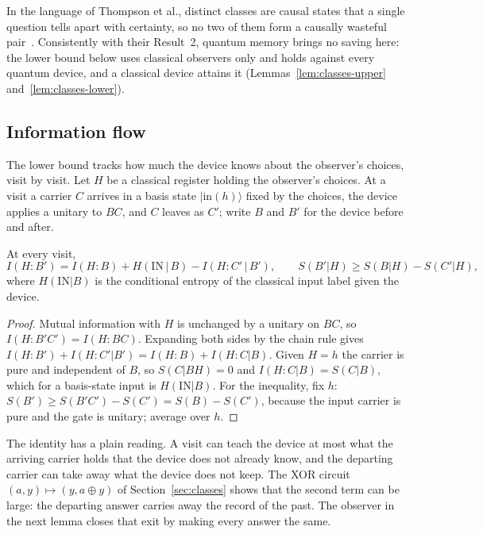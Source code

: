 In the language of Thompson et al., distinct classes are causal states that a single question tells apart with certainty, so no two of them form a causally wasteful pair~\cite{Thompson25}. Consistently with their Result~2, quantum memory brings no saving here: the lower bound below uses classical observers only and holds against every quantum device, and a classical device attains it (Lemmas~\ref{lem:classes-upper} and~\ref{lem:classes-lower}).

\subsection{Information flow}

The lower bound tracks how much the device knows about the observer's choices, visit by visit. Let $H$ be a classical register holding the observer's choices. At a visit a carrier $C$ arrives in a basis state $|\mathrm{in}(h)\rangle$ fixed by the choices, the device applies a unitary to $BC$, and $C$ leaves as $C'$; write $B$ and $B'$ for the device before and after.

\begin{lemma}\label{lem:flow}
At every visit,
\[
I(H{:}B')=I(H{:}B)+H(\mathrm{IN}\,|\,B)-I(H{:}C'\,|\,B'),
\qquad
S(B'|H)\ge S(B|H)-S(C'|H),
\]
where $H(\mathrm{IN}|B)$ is the conditional entropy of the classical input label given the device.
\end{lemma}
\begin{proof}
Mutual information with $H$ is unchanged by a unitary on $BC$, so $I(H{:}B'C')=I(H{:}BC)$. Expanding both sides by the chain rule gives $I(H{:}B')+I(H{:}C'|B')=I(H{:}B)+I(H{:}C|B)$. Given $H=h$ the carrier is pure and independent of $B$, so $S(C|BH)=0$ and $I(H{:}C|B)=S(C|B)$, which for a basis-state input is $H(\mathrm{IN}|B)$. For the inequality, fix $h$: $S(B')\ge S(B'C')-S(C')=S(B)-S(C')$, because the input carrier is pure and the gate is unitary; average over $h$.
\end{proof}

The identity has a plain reading. A visit can teach the device at most what the arriving carrier holds that the device does not already know, and the departing carrier can take away what the device does not keep. The XOR circuit $(a,y)\mapsto(y,a\oplus y)$ of Section~\ref{sec:classes} shows that the second term can be large: the departing answer carries away the record of the past. The observer in the next lemma closes that exit by making every answer the same.

